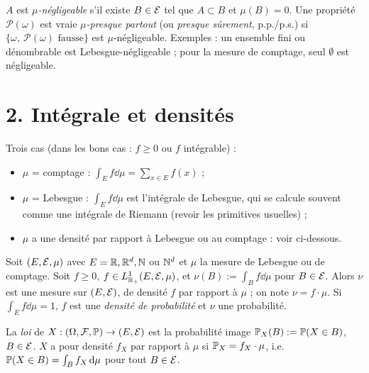 \documentclass[11pt,a4paper]{article}
\begin{document}
\begin{definition}\label{C2:negligeable}
$A$ est \emph{$\mu$-négligeable} s'il existe $B\in\mathcal{E}$ tel que $A\subset B$ et $\mu(B)=0$.
Une propriété $\mathcal P(\omega)$ est vraie \emph{$\mu$-presque partout} (ou \emph{presque sûrement}, p.p./p.s.)
si $\{\omega,\ \mathcal P(\omega)\text{ fausse}\}$ est $\mu$-négligeable.
Exemples : un ensemble fini ou dénombrable est Lebesgue-négligeable ; pour la mesure de comptage, seul $\emptyset$ est négligeable.
\end{definition}

\section*{2. Intégrale et densités}

Trois cas (dans les bons cas : $f\ge0$ ou $f$ intégrable) :
\begin{itemize}
  \item $\mu$ = comptage : $\displaystyle\int_E f\dd\mu=\sum_{x\in E}f(x)$ ;
  \item $\mu$ = Lebesgue : $\int_E f\dd\mu$ est l'intégrale de Lebesgue, qui se calcule souvent comme une intégrale de Riemann
  (revoir les primitives usuelles) ;
  \item $\mu$ a une densité par rapport à Lebesgue ou au comptage : voir ci-dessous.
\end{itemize}

\begin{lemme}\label{C2:densite}
Soit $(E,\mathcal{E},\mu)$ avec $E=\mathbb{R},\mathbb{R}^d,\mathbb{N}$ ou $\mathbb{N}^d$ et $\mu$ la mesure de Lebesgue ou de comptage. Soit
$f\ge0$, $f\in L^1_{\mathbb{R}_+}(E,\mathcal{E},\mu)$, et $\nu(B):=\int_B f\dd\mu$ pour $B\in\mathcal{E}$. Alors $\nu$ est une mesure sur
$(E,\mathcal{E})$, de densité $f$ par rapport à $\mu$ ; on note $\nu=f\cdot\mu$.
Si $\int_E f\dd\mu=1$, $f$ est une \emph{densité de probabilité} et $\nu$ une probabilité.
\end{lemme}

\begin{definition}\label{C2:loi}
La \emph{loi} de $X:(\Omega,\mathcal{F},\mathbb{P})\to(E,\mathcal{E})$ est la probabilité image $\mathbb{P}_X(B):=\mathbb{P}(X\in B)$, $B\in\mathcal{E}$.
$X$ a pour densité $f_X$ par rapport à $\mu$ si $\mathbb{P}_X=f_X\cdot\mu$, i.e.\ $\mathbb{P}(X\in B)=\int_B f_X\,\mathrm{d}\mu$ pour tout $B\in\mathcal{E}$.
\end{definition}
\end{document}
